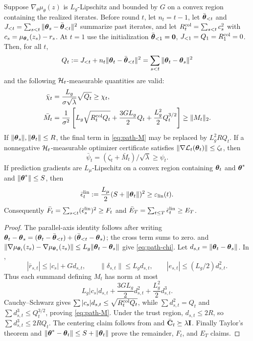 \begin{lemma}\label{lem:path-certificates}
Suppose $\nabla_\theta\mu_\theta(z)$ is $L_g$-Lipschitz and bounded by $G$
on a convex region containing the realized iterates.  Before round $t$, let
$n_t=t-1$, let $\bar{\boldsymbol{\theta}}_{<t}$ and
$J_{<t}=\sum_{s<t}\|\boldsymbol{\theta}_s-\bar{\boldsymbol{\theta}}_{<t}\|^2$ summarize past
iterates, and let
$R_t^{\rm col}=\sum_{s<t}c_s^2$ with
$c_s=\mu_{\boldsymbol{\theta}_s}(z_s)-r_s$.  At $t=1$ use the initialization
$\bar{\boldsymbol{\theta}}_{<1}=\mathbf0$, $J_{<1}=Q_1=R_1^{\rm col}=0$.  Then, for all $t$,
\[
 Q_t:=J_{<t}+n_t\|\boldsymbol{\theta}_t-\bar{\boldsymbol{\theta}}_{<t}\|^2
 =\sum_{s<t}\|\boldsymbol{\theta}_t-\boldsymbol{\theta}_s\|^2
\]
and the following $\mathcal{H}_t$-measurable quantities are valid:
\begin{align}
 \bar\chi_t&=\frac{L_g}{\sigma\sqrt\lambda}\sqrt{Q_t}\ge\chi_t,\label{eq:path-chi}\\
 \bar M_t&=\frac1{\sigma^2}\left[
 L_g\sqrt{R_t^{\rm col}Q_t}+\frac{3GL_g}{2}Q_t
 +\frac{L_g^2}{2}Q_t^{3/2}\right]\ge\|M_t\|_2.\label{eq:path-M}
\end{align}
If $\|\boldsymbol{\theta}_s\|,\|\boldsymbol{\theta}_t\|\le R$, the final term in
\eqref{eq:path-M} may be replaced by $L_g^2RQ_t$.  If a nonnegative
$\mathcal{H}_t$-measurable optimizer certificate satisfies
$\|\nabla\mathcal{L}_t(\boldsymbol{\theta}_t)\|\le\zeta_t$, then
\[
 \bar\psi_t=(\zeta_t+\bar M_t)/\sqrt\lambda\ge\psi_t.
\]
If prediction gradients are $L_\mu$-Lipschitz on a convex region containing
$\boldsymbol{\theta}_t$ and $\boldsymbol{\theta}^*$ and $\|\boldsymbol{\theta}^*\|\le S$, then
\[
 \bar\epsilon_t^{\rm lin}:=\frac{L_\mu}{2}(S+\|\boldsymbol{\theta}_t\|)^2
 \ge\varepsilon_{\mathrm{lin}}(t).
\]
Consequently
$\bar F_t=\sum_{s<t}(\bar\epsilon_s^{\rm lin})^2\ge F_t$ and
$\bar E_T=\sum_{t\le T}\bar\epsilon_t^{\rm lin}\ge E_T$.
\end{lemma}
\begin{proof}
The parallel-axis identity follows after writing
$\boldsymbol{\theta}_t-\boldsymbol{\theta}_s=(\boldsymbol{\theta}_t-\bar{\boldsymbol{\theta}}_{<t})
+(\bar{\boldsymbol{\theta}}_{<t}-\boldsymbol{\theta}_s)$; the cross term sums to zero.
 and
$\|\nabla\mu_{\boldsymbol{\theta}_t}(z_s)-\nabla\mu_{\boldsymbol{\theta}_s}(z_s)\|
\le L_g\|\boldsymbol{\theta}_t-\boldsymbol{\theta}_s\|$ give \eqref{eq:path-chi}.
Let $d_{s,t}=\|\boldsymbol{\theta}_t-\boldsymbol{\theta}_s\|$.  In
,
\[
 |\bar r_{s,t}|\le |c_s|+Gd_{s,t},\qquad
 \|\delta_{s,t}\|\le L_gd_{s,t},\qquad
 |e_{s,t}|\le(L_g/2)d_{s,t}^2.
\]
Thus each summand defining $M_t$ has norm at most
\[
 L_g|c_s|d_{s,t}+\frac{3GL_g}{2}d_{s,t}^2
 +\frac{L_g^2}{2}d_{s,t}^3.
\]
Cauchy--Schwarz gives
$\sum|c_s|d_{s,t}\le\sqrt{R_t^{\rm col}Q_t}$, while
$\sum d_{s,t}^2=Q_t$ and
$\sum d_{s,t}^3\le Q_t^{3/2}$, proving \eqref{eq:path-M}.
Under the trust region, $d_{s,t}\le2R$, so
$\sum d_{s,t}^3\le2RQ_t$.  The centering claim follows from
 and $\bar{\mathbf{C}}_t\succeq\lambda\mathbf{I}$.
Finally Taylor's theorem and
$\|\boldsymbol{\theta}^*-\boldsymbol{\theta}_t\|\le S+\|\boldsymbol{\theta}_t\|$ prove the remainder,
$F_t$, and $E_T$ claims.
\end{proof}

